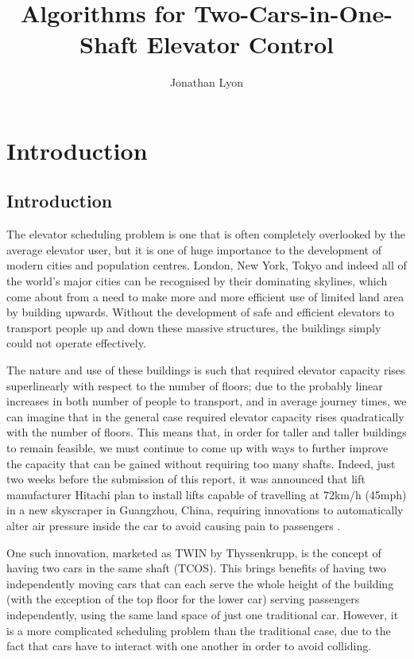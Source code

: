 \documentclass{UoYCSproject}
\author{Jonathan Lyon}
\title{Algorithms for Two-Cars-in-One-Shaft Elevator Control}
\begin{document}
\renewcommand{\thepage}{\roman{page}}
\maketitle

\newpage
\thispagestyle{empty}
\mbox{}

\chapter{Introduction}
\setcounter{page}{1}
\renewcommand{\thepage}{\arabic{page}}

\section{Introduction}

The elevator scheduling problem is one that is often completely overlooked by the average elevator user, but it is one of huge importance to the development of modern cities and population centres.  London, New York, Tokyo and indeed all of the world's major cities can be recognised by their dominating skylines, which come about from a need to make more and more efficient use of limited land area by building upwards.  Without the development of safe and efficient elevators to transport people up and down these massive structures, the buildings simply could not operate effectively.

The nature and use of these buildings is such that required elevator capacity rises superlinearly with respect to the number of floors; due to the probably linear increases in both number of people to transport, and in average journey times, we can imagine that in the general case required elevator capacity rises quadratically with the number of floors.  This means that, in order for taller and taller buildings to remain feasible, we must continue to come up with ways to further improve the capacity that can be gained without requiring too many shafts.  Indeed, just two weeks before the submission of this report, it was announced that lift manufacturer Hitachi plan to install lifts capable of travelling at 72km/h (45mph) in a new skyscraper in Guangzhou, China, requiring innovations to automatically alter air pressure inside the car to avoid causing pain to passengers \citep{BBC2014}.

One such innovation, marketed as TWIN by Thyssenkrupp, is the concept of having two cars in the same shaft (TCOS).  This brings benefits of having two independently moving cars that can each serve the whole height of the building (with the exception of the top floor for the lower car) serving passengers independently, using the same land space of just one traditional car.  However, it is a more complicated scheduling problem than the traditional case, due to the fact that cars have to interact with one another in order to avoid colliding.
\end{document}
